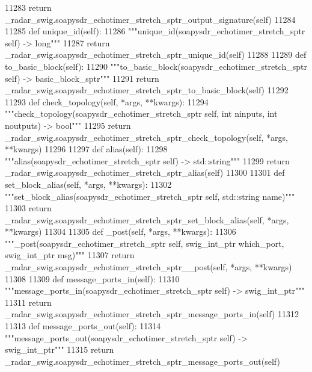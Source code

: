 \begin{DoxyCode}
{{{{{{{{{{{{{{{{{{{{{{{{{{{{{{{{{{{11283         \textcolor{keywordflow}{return} \_radar\_swig.soapysdr\_echotimer\_stretch\_sptr\_output\_signature(self)
11284 
11285     \textcolor{keyword}{def }unique_id(self):
11286         \textcolor{stringliteral}{"""unique\_id(soapysdr\_echotimer\_stretch\_sptr self) -> long"""}
11287         \textcolor{keywordflow}{return} \_radar\_swig.soapysdr\_echotimer\_stretch\_sptr\_unique\_id(self)
11288 
11289     \textcolor{keyword}{def }to_basic_block(self):
11290         \textcolor{stringliteral}{"""to\_basic\_block(soapysdr\_echotimer\_stretch\_sptr self) -> basic\_block\_sptr"""}
11291         \textcolor{keywordflow}{return} \_radar\_swig.soapysdr\_echotimer\_stretch\_sptr\_to\_basic\_block(self)
11292 
11293     \textcolor{keyword}{def }check_topology(self, *args, **kwargs):
11294         \textcolor{stringliteral}{"""check\_topology(soapysdr\_echotimer\_stretch\_sptr self, int ninputs, int noutputs) -> bool"""}
11295         \textcolor{keywordflow}{return} \_radar\_swig.soapysdr\_echotimer\_stretch\_sptr\_check\_topology(self, *args, **kwargs)
11296 
11297     \textcolor{keyword}{def }alias(self):
11298         \textcolor{stringliteral}{"""alias(soapysdr\_echotimer\_stretch\_sptr self) -> std::string"""}
11299         \textcolor{keywordflow}{return} \_radar\_swig.soapysdr\_echotimer\_stretch\_sptr\_alias(self)
11300 
11301     \textcolor{keyword}{def }set_block_alias(self, *args, **kwargs):
11302         \textcolor{stringliteral}{"""set\_block\_alias(soapysdr\_echotimer\_stretch\_sptr self, std::string name)"""}
11303         \textcolor{keywordflow}{return} \_radar\_swig.soapysdr\_echotimer\_stretch\_sptr\_set\_block\_alias(self, *args, **kwargs)
11304 
11305     \textcolor{keyword}{def }_post(self, *args, **kwargs):
11306         \textcolor{stringliteral}{"""\_post(soapysdr\_echotimer\_stretch\_sptr self, swig\_int\_ptr which\_port, swig\_int\_ptr msg)"""}
11307         \textcolor{keywordflow}{return} \_radar\_swig.soapysdr\_echotimer\_stretch\_sptr\_\_post(self, *args, **kwargs)
11308 
11309     \textcolor{keyword}{def }message_ports_in(self):
11310         \textcolor{stringliteral}{"""message\_ports\_in(soapysdr\_echotimer\_stretch\_sptr self) -> swig\_int\_ptr"""}
11311         \textcolor{keywordflow}{return} \_radar\_swig.soapysdr\_echotimer\_stretch\_sptr\_message\_ports\_in(self)
11312 
11313     \textcolor{keyword}{def }message_ports_out(self):
11314         \textcolor{stringliteral}{"""message\_ports\_out(soapysdr\_echotimer\_stretch\_sptr self) -> swig\_int\_ptr"""}
11315         \textcolor{keywordflow}{return} \_radar\_swig.soapysdr\_echotimer\_stretch\_sptr\_message\_ports\_out(self)
}}}}}}}}}}}}}}}}}}}}}}}}}}}}}}}}}}}
\end{DoxyCode}
